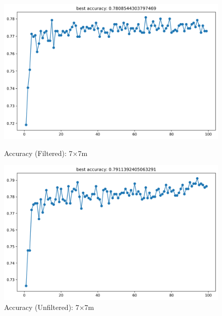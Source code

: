 \documentclass[runningheads]{llncs}
\begin{document}
\begin{figure}[H]
	\centering
	\begin{minipage}{0.49\textwidth}
		\centering
		\includegraphics[width=\textwidth]{figures/filtered/xgbrf_acc_7.png}
		\caption*{Accuracy (Filtered): 7×7m}
	\end{minipage}
	\hfill
	\begin{minipage}{0.49\textwidth}
		\centering
		\includegraphics[width=\textwidth]{figures/unfiltered/xgbrf_acc_7.png}
		\caption*{Accuracy (Unfiltered): 7×7m}
	\end{minipage}
\end{figure}
\end{document}
